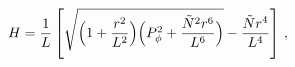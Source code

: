 \begin{equation}
\label{Hmacdual}
H=\frac{1}{L}\left[\sqrt{\Bigl(1+\frac{r^2}{L^2}\Bigr)
                         \Bigl(P_\phi^2+\frac{{\tilde N}^2r^6}{L^6}\Bigr)}
-\frac{{\tilde N}r^4}{L^4}\right]\, ,
\end{equation}

